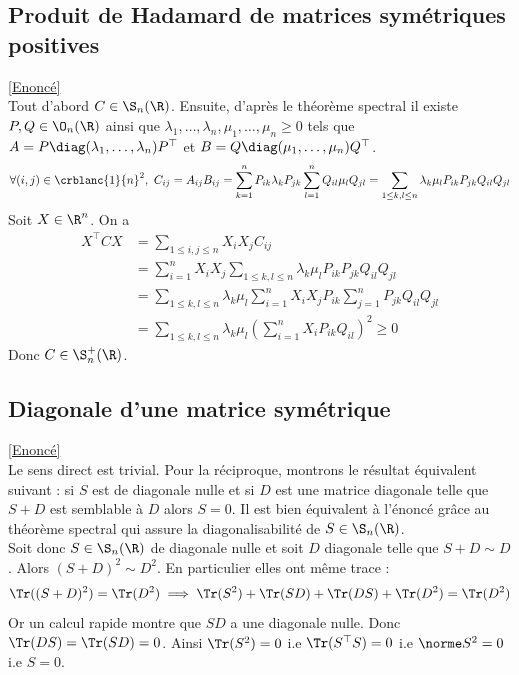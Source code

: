 \documentclass[8pt]{book}
\begin{document}
	\subsection{Produit de Hadamard de matrices symétriques positives}
	\label{Produit de Hadamard de matrices symétriques positives corrigé}
	\textcolor{blue}{\hyperref[Produit de Hadamard de matrices symétriques positives]{[Enoncé]}}\\
	Tout d'abord $C\in \S_n(\R)$. Ensuite, d'après le théorème spectral il existe $P,Q\in \O_n(\R)$ ainsi que $\lambda_1,\dots,\lambda_n,\mu_1,\dots,\mu_n\geq 0$ tels que $A=P\diag(\lambda_1,\dots,\lambda_n)P^\top$ et $B=Q\diag(\mu_1,\dots,\mu_n)Q^\top$.
	$$\forall (i,j)\in \crblanc{1}{n}^2,\ C_{ij}=A_{ij}B_{ij}=\sum_{k=1}^nP_{ik}\lambda_kP_{jk}\sum_{l=1}^nQ_{il}\mu_lQ_{jl}=\sum_{1\leq k,l\leq n}\lambda_k\mu_lP_{ik}P_{jk}Q_{il}Q_{jl}$$
	Soit $X\in \R^n$. On a
	\begin{align*}
		X^\top CX&=\sum_{1\leq i,j\leq n}X_iX_jC_{ij}\\
		&=\sum_{i=1}^nX_iX_j\sum_{1\leq k,l\leq n}\lambda_k\mu_lP_{ik}P_{jk}Q_{il}Q_{jl}\\
		&=\sum_{1\leq k,l\leq n}\lambda_k\mu_l\sum_{i=1}^nX_iX_jP_{ik}\sum_{j=1}^nP_{jk}Q_{il}Q_{jl}\\
		&=\sum_{1\leq k,l\leq n}\lambda_k\mu_l\left(\sum_{i=1}^nX_iP_{ik}Q_{il}\right)^2\geq 0
	\end{align*}
	Donc $C\in \S_n^+(\R)$.
	
	\subsection{Diagonale d'une matrice symétrique}
	\label{Diagonale d'une matrice symétrique corrigé}
	\textcolor{blue}{\hyperref[Diagonale d'une matrice symétrique]{[Enoncé]}}\\
	Le sens direct est trivial. Pour la réciproque, montrons le résultat équivalent suivant : si $S$ est de diagonale nulle et si $D$ est une matrice diagonale telle que $S+D$ est semblable à $D$ alors $S=0$.
	Il est bien équivalent à l'énoncé grâce au théorème spectral qui assure la diagonalisabilité de $S\in \S_n(\R)$.\\
	Soit donc $S\in \S_n(\R)$ de diagonale nulle et soit $D$ diagonale telle que $S+D\sim D$. Alors $(S+D)^2\sim D^2$. En particulier elles ont même trace :
	$$\Tr((S+D)^2)=\Tr(D^2)\implies \Tr(S^2)+\Tr(SD)+\Tr(DS)+\Tr(D^2)=\Tr(D^2)$$
	Or un calcul rapide montre que $SD$ a une diagonale nulle. Donc $\Tr(DS)=\Tr(SD)=0$. Ainsi $\Tr(S^2)=0$ i.e $\Tr(S^\top S)=0$ i.e $\norme S^2=0$ i.e $S=0$.
	
\end{document}
